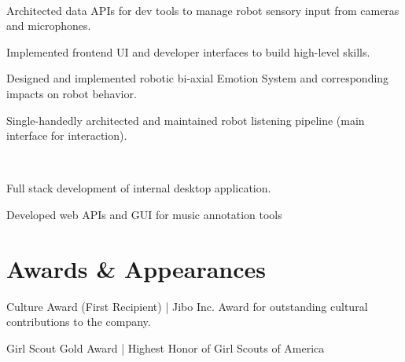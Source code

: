 \documentclass[]{csaund_resume-openfont}
\begin{document}
\begin{minipage}[t]{0.66\textwidth}
 \\
\begin{tightemize}
\item Architected data APIs for dev tools to manage robot sensory input from cameras and microphones.
\item Implemented frontend UI and developer interfaces to build high-level skills.
\end{tightemize}
\begin{tightemize}
\item Designed and implemented robotic bi-axial Emotion System and corresponding impacts on robot behavior.
\item Single-handedly architected and maintained robot listening pipeline (main interface for interaction).
\end{tightemize}
\sectionsep

 \\
\begin{tightemize}
\item Full stack development of internal desktop application.
\item Developed web APIs and GUI for music annotation tools
\end{tightemize}
\sectionsep

\end{minipage}

\pagebreak


\section{Awards \& Appearances}
\descript{ }
\begin{tightemize}
\item Culture Award (First Recipient) | Jibo Inc. Award for outstanding cultural contributions to the company.
\item Girl Scout Gold Award | Highest Honor of Girl Scouts of America
\end{tightemize}
\sectionsep
\end{document}
